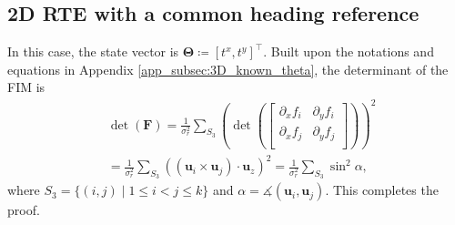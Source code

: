 \documentclass[journal]{IEEEtran}
\def\StateVector{\mathbf{\Theta}}
\def\FIM{\mathbf{F}}
\def\UnitZ{\mathbf{u}_z}
\DeclareMathOperator{\atantwo}{atan2}
\begin{document}
\begin{appendices}
\subsection{2D RTE with a common heading reference}
In this case, the state vector is $\StateVector \coloneqq [t^x, t^y]^\top$. Built upon the notations and equations in Appendix \ref{app_subsec:3D_known_theta}, the determinant of the FIM is
\begin{equation}
\begin{aligned}
    &\det(\FIM) = 
    \frac{1}{\sigma_r^2} \sum\limits_{S_3}^{}
    \left(\det \left(
    \begin{bmatrix}
        \partial_x f_i & \partial_y f_i \\
        \partial_x f_j & \partial_y f_j \\
    \end{bmatrix} \right) \right)^2 \\
    &= 
    \frac{1}{\sigma_r^2} \sum\limits_{S_3}^{}
    \left(
    (\mathbf{u}_i \times \mathbf{u}_j) \cdot \UnitZ
    \right)^2
    = 
    \frac{1}{\sigma_r^2} \sum\limits_{S_3}^{}
    \sin^2\alpha,
\end{aligned}
\end{equation}
where $S_3 = \{(i,j) \; \vert \; 1 \leq i < j \leq k \}$ and $\alpha = \measuredangle(\mathbf{u}_i,\mathbf{u}_j)$.
This completes the proof.

\end{appendices}

\balance


\end{document}
